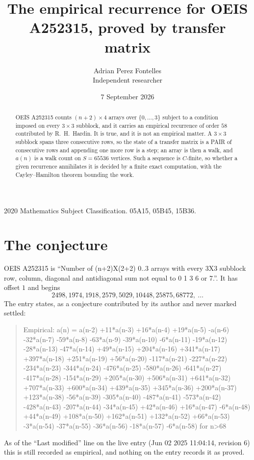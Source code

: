 \documentclass[11pt,a4paper]{article}
\title{The empirical recurrence for OEIS A252315, proved by transfer matrix}
\author{Adrian Perez Fontelles\\ \small Independent researcher}
\date{7 September 2026}
\theoremstyle{plain}
\theoremstyle{definition}
\begin{document}
\maketitle

\begin{abstract}
OEIS A252315 counts $(n+2)\times4$ arrays over $\{0,\dots,3\}$ subject to a condition imposed on
every $3\times3$ subblock, and it carries an empirical recurrence of order $58$
contributed by R.~H.~Hardin. It is true, and it is not an empirical matter. A $3\times3$
subblock spans three consecutive rows, so the state of a transfer matrix is a PAIR of
consecutive rows and appending one more row is a step; an array is then a walk, and
$a(n)$ is a walk count on $S=65536$ vertices. Such a sequence is $C$-finite, so whether a given
recurrence annihilates it is decided by a finite exact computation, with the Cayley--Hamilton
theorem bounding the work.
\end{abstract}

\noindent\small 2020 Mathematics Subject Classification. 05A15, 05B45, 15B36.\normalsize

\section{The conjecture}

OEIS A252315 is ``Number of (n+2)X(2+2) 0..3 arrays with every 3X3 subblock row, column, diagonal and antidiagonal sum not equal to 0 1 3 6 or 7.''. It has offset $1$ and begins
\[
2498, 1974, 1918, 2579, 5029, 10448, 25875, 68772,\ \dots
\]
The entry states, as a conjecture contributed by its author and never marked settled:
\begin{quote}
Empirical: a(n) = a(n-2) +11*a(n-3) +16*a(n-4) +19*a(n-5) -a(n-6) -32*a(n-7) -59*a(n-8) -63*a(n-9) -39*a(n-10) -6*a(n-11) -19*a(n-12) -28*a(n-13) -47*a(n-14) +49*a(n-15) +204*a(n-16) +341*a(n-17) +397*a(n-18) +251*a(n-19) +56*a(n-20) -117*a(n-21) -227*a(n-22) -234*a(n-23) -344*a(n-24) -476*a(n-25) -580*a(n-26) -641*a(n-27) -417*a(n-28) -154*a(n-29) +205*a(n-30) +506*a(n-31) +641*a(n-32) +707*a(n-33) +600*a(n-34) +439*a(n-35) +345*a(n-36) +200*a(n-37) +123*a(n-38) -56*a(n-39) -305*a(n-40) -487*a(n-41) -573*a(n-42) -428*a(n-43) -207*a(n-44) -34*a(n-45) +42*a(n-46) +16*a(n-47) -6*a(n-48) +44*a(n-49) +108*a(n-50) +162*a(n-51) +132*a(n-52) +66*a(n-53) -3*a(n-54) -37*a(n-55) -36*a(n-56) -18*a(n-57) -6*a(n-58) for n>68
\end{quote}
As of the ``Last modified'' line on the live entry (Jun 02 2025 11:04:14, revision 6) this is still
recorded as empirical, and nothing on the entry records it as proved.
\end{document}
